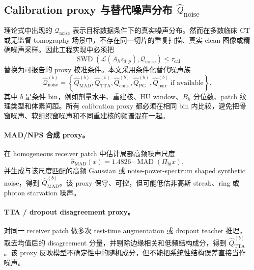 \documentclass[11pt,a4paper,UTF8,fontset=fandol]{ctexart}
\theoremstyle{definition}
\DeclareMathOperator{\SWD}{SWD}
\DeclareMathOperator{\MAD}{MAD}
\begin{document}
\subsection{Calibration proxy 与替代噪声分布 \texorpdfstring{$\widehat{\mathcal Q}_{\mathrm{noise}}$}{Q-noise proxy}}

理论式中出现的 $\mathcal Q_{\mathrm{noise}}$ 表示目标数据条件下的真实噪声分布。然而在多数临床 CT 或无监督 tomography 场景中，不存在同一切片的重复扫描、真实 clean 图像或精确噪声采样。因此工程实现中必须把
\begin{equation}
    \SWD(\mathcal L(A_hz_{d,p}),\mathcal Q_{\mathrm{noise}})\le\tau_{\mathrm{cal}}
\end{equation}
替换为可报告的 proxy 校准条件。本文采用条件化替代噪声族
\begin{equation}
\label{eq:qnoise-proxy-family-auditB}
    \widehat{\mathcal Q}_{\mathrm{noise}}^{(b)}
    =\left\{
    \widehat Q_{\mathrm{MAD}}^{(b)},
    \widehat Q_{\mathrm{TTA}}^{(b)},
    \widehat Q_{\mathrm{cons}}^{(b)},
    \widehat Q_{\mathrm{PG}}^{(b)},
    \widehat Q_{\mathrm{pair}}^{(b)}\ \text{if available}
    \right\},
\end{equation}
其中 $b$ 是条件 bin，例如剂量水平、重建核、HU window、$B_h$ 分位数、patch 纹理类型和体素间距。所有 calibration proxy 都必须在相同 bin 内比较，避免把骨窗噪声、软组织窗噪声和不同重建核的频谱混在一起。

\paragraph{MAD/NPS 合成 proxy。}
在 homogeneous receiver patch 中估计局部高频噪声尺度
\begin{equation}
    \widehat\sigma_{\mathrm{MAD}}(x)=1.4826\cdot\MAD(\Pi_{\mathrm{hi}}x),
\end{equation}
并生成与该尺度匹配的高频 Gaussian 或 noise-power-spectrum shaped synthetic noise，得到 $\widehat Q_{\mathrm{MAD}}^{(b)}$。该 proxy 保守、可控，但可能低估非高斯 streak、ring 或 photon starvation 噪声。

\paragraph{TTA / dropout disagreement proxy。}
对同一 receiver patch 做多次 test-time augmentation 或 dropout teacher 推理，取去均值后的 disagreement 分量，并剔除边缘相关和低频结构成分，得到 $\widehat Q_{\mathrm{TTA}}^{(b)}$。该 proxy 反映模型不确定性中的随机成分，但不能把系统性结构误差直接当作噪声。
\end{document}
